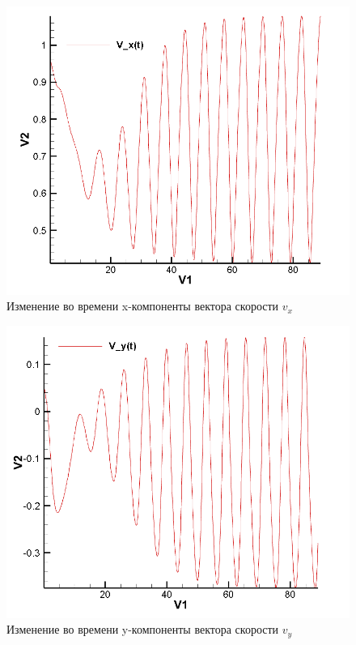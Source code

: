 \documentclass[12pt, a4paper]{article}
\begin{document}
\begin{figure}[H]
    \centering
    \includegraphics[scale=0.5]{figure/V_x(t).png}
    \caption{Изменение во времени x-компоненты вектора скорости $v_x$}
    \label{fig:my_labe5}
\end{figure}

\begin{figure}[H]
    \centering
    \includegraphics[scale=0.5]{figure/V_y(t).png}
    \caption{Изменение во времени y-компоненты вектора скорости $v_y$}
    \label{fig:my_labe4}
\end{figure}
\end{document}
